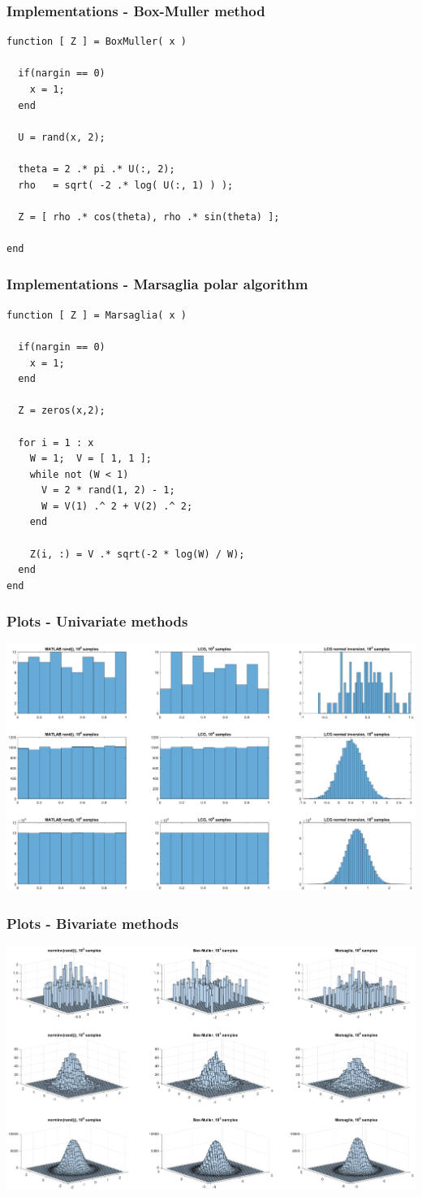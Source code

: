 \documentclass[10pt, compress]{beamer}
\begin{document}
\begin{frame}[fragile]
	\frametitle{Implementations - Box-Muller method}
	\begin{verbatim}
function [ Z ] = BoxMuller( x )

  if(nargin == 0)
    x = 1;
  end

  U = rand(x, 2);
  
  theta = 2 .* pi .* U(:, 2);
  rho   = sqrt( -2 .* log( U(:, 1) ) );
  
  Z = [ rho .* cos(theta), rho .* sin(theta) ];

end
	\end{verbatim}
\end{frame}

\begin{frame}[fragile]
	\frametitle{Implementations - Marsaglia polar algorithm}
	\begin{verbatim}
function [ Z ] = Marsaglia( x )

  if(nargin == 0)
    x = 1;
  end

  Z = zeros(x,2);
  
  for i = 1 : x
    W = 1;  V = [ 1, 1 ];
    while not (W < 1)
      V = 2 * rand(1, 2) - 1;
      W = V(1) .^ 2 + V(2) .^ 2;
    end
    
    Z(i, :) = V .* sqrt(-2 * log(W) / W);
  end
end
	\end{verbatim}
\end{frame}

\begin{frame}[fragile]
	\frametitle{Plots - Univariate methods}
	\includegraphics[width=\textwidth, trim=70mm 80mm 70mm 20mm]{../univariate.eps}
\end{frame}

\begin{frame}[fragile]
	\frametitle{Plots - Bivariate methods}
	\includegraphics[width=\textwidth, trim=70mm 80mm 70mm 20mm]{../bivariate.eps}
\end{frame}
\end{document}
